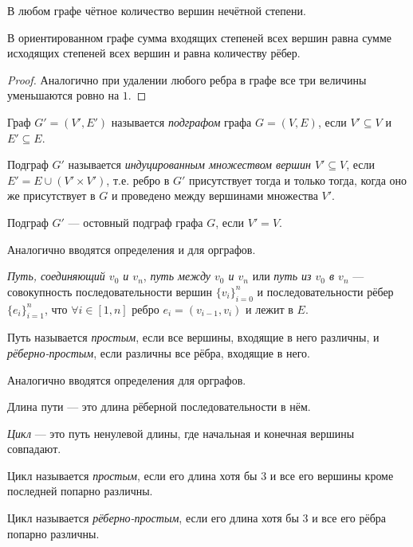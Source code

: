\documentclass[12pt,a4paper]{article}
\begin{document}
    \begin{corollary}
        В любом графе чётное количество вершин нечётной степени.
    \end{corollary}

    \begin{lemma}
        В ориентированном графе сумма входящих степеней всех вершин равна сумме исходящих степеней всех вершин и равна количеству рёбер.
    \end{lemma}

    \begin{proof}
        Аналогично при удалении любого ребра в графе все три величины уменьшаются ровно на $1$.
    \end{proof}

    \begin{definition}
        Граф $G' = (V', E')$ называется \emph{подграфом} графа $G = (V, E)$, если $V' \subseteq V$ и $E' \subseteq E$.

        Подграф $G'$ называется \emph{индуцированным множеством вершин $V' \subseteq V$}, если $E' = E \cup (V' \times V')$, т.е. ребро в $G'$ присутствует тогда и только тогда, когда оно же присутствует в $G$ и проведено между вершинами множества $V'$.

        Подграф $G'$ --- остовный подграф графа $G$, если $V' = V$.

        Аналогично вводятся определения и для орграфов.
    \end{definition}

    \begin{definition}
        \emph{Путь, соединяющий $v_0$ и $v_n$}, \emph{путь между $v_0$ и $v_n$} или \emph{путь из $v_0$ в $v_n$} --- совокупность последовательности вершин $\{v_i\}_{i=0}^n$ и последовательности рёбер $\{e_i\}_{i=1}^n$, что $\forall i \in [1, n]$ ребро $e_i = (v_{i-1}, v_i)$ и лежит в $E$.

        Путь называется \emph{простым}, если все вершины, входящие в него различны, и \emph{рё\-бер\-но-\-прос\-тым}, если различны все рёбра, входящие в него.

        Аналогично вводятся определения для орграфов.

        Длина пути --- это длина рёберной последовательности в нём.
    \end{definition}

    \begin{definition}
        \emph{Цикл} --- это путь ненулевой длины, где начальная и конечная вершины совпадают.

        Цикл называется \emph{простым}, если его длина хотя бы $3$ и все его вершины кроме последней попарно различны.

        Цикл называется \emph{рёберно-простым}, если его длина хотя бы $3$ и все его рёбра попарно различны.
    \end{definition}
\end{document}
